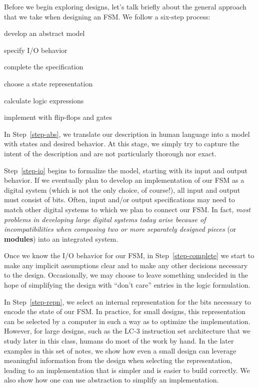 Before we begin exploring designs, let's talk briefly about the general
approach that we take when designing an FSM.  We follow a six-step
process:\vspace{-8pt}
%
\begin{enumerate}{\setlength{\itemsep}{0pt}\setlength{\parskip}{0pt}%
\setlength{\topsep}{0pt}\setlength{\partopsep}{0pt}\setlength{\parsep}{0pt}
\item{develop an abstract model}\label{step-abs}
\item{specify I/O behavior}\label{step-io}
\item{complete the specification}\label{step-complete}
\item{choose a state representation}\label{step-repn}
\item{calculate logic expressions}\label{step-logic}
\item{implement with flip-flops and gates}\label{step-gates}
}
\end{enumerate}\vspace{-8pt}
%
In Step~\ref{step-abs}, we translate our description in human language
into a model with states and desired behavior.  At this stage, we 
simply try to capture the intent of the description and are not
particularly thorough nor exact.

Step~\ref{step-io} begins to formalize the model, starting with its
input and output behavior.  If we eventually plan to develop an
implementation of our FSM as a digital system (which is not the 
only choice, of course!), all input and output
must consist of bits.  Often, input and/or output specifications
may need to match other digital systems to which we plan to connect
our FSM.  In fact, {\em most problems in developing large digital systems
today arise because of incompatibilities when composing two or more
separately designed pieces} (or {\bf modules}) into an integrated system.

Once we know the I/O behavior for our FSM, in Step~\ref{step-complete}
we start to make
any implicit assumptions clear and to make any other decisions
necessary to the design.  Occasionally, we may choose to leave
something undecided in the hope of simplifying the design with
``don't care'' entries in the logic formulation.

In Step~\ref{step-repn}, we select an internal representation
for the bits necessary to encode the state of our FSM.  In practice,
for small designs, this representation can be selected by a computer 
in such a way as to optimize the implementation.  However, for large
designs, such as the LC-3 instruction set architecture that we
study later in this class, humans do most of the work by hand.
%
In the later examples in this set of notes, we show how even a 
small design can
leverage meaningful information from the design when selecting
the representation, leading to an implementation that is simpler
and is easier to build correctly.
%
We also show how one can
use abstraction to simplify an implementation.

